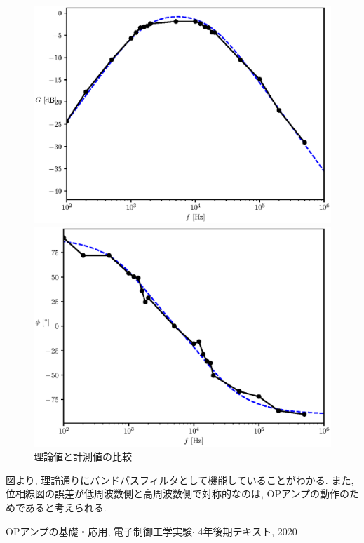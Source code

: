 \documentclass[titlepage]{jsarticle}
\begin{document}
        \begin{figure}[h]
            \begin{minipage}{0.5\hsize}
                \centering
                \includegraphics[width=1.1\hsize]{img/band-1.eps}
            \end{minipage}
            \begin{minipage}{0.5\hsize}
                \centering
                \includegraphics[width=1.1\hsize]{img/band-2.eps}
            \end{minipage}
            \caption{理論値と計測値の比較}
            \label{fig:bandex}
        \end{figure}

        図より, 理論通りにバンドパスフィルタとして機能していることがわかる.
        また, 位相線図の誤差が低周波数側と高周波数側で対称的なのは,
        OPアンプの動作のためであると考えられる.
    
\begin{thebibliography}{99}
     OPアンプの基礎・応用, 電子制御工学実験$\cdot$ 4年後期テキスト, 2020
\end{thebibliography}
\end{document}
